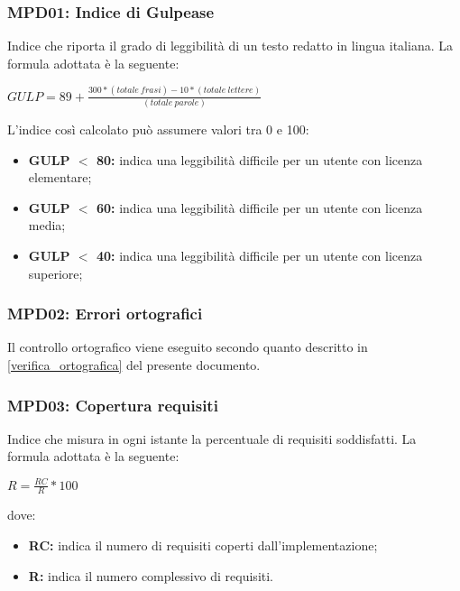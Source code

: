    \subsubsection{MPD01: Indice di Gulpease}
    Indice che riporta il grado di leggibilità di un testo redatto in lingua italiana.
    La formula adottata è la seguente: 
    \begin{center}
        $GULP = 89 + \displaystyle \frac{300*(totale\ frasi)-10*(totale\ lettere)}{(totale\ parole)}$
    \end{center}
    L’indice così calcolato può assumere valori tra 0 e 100:
    \begin{itemize}
        \item \textbf{GULP $<$ 80:} indica una leggibilità difficile per un utente con licenza elementare;
        \item \textbf{GULP $<$ 60:} indica una leggibilità difficile per un utente con licenza media;
        \item \textbf{GULP $<$ 40:} indica una leggibilità difficile per un utente con licenza superiore;
    \end{itemize}

    \subsubsection{MPD02: Errori ortografici}
    Il controllo ortografico viene eseguito secondo quanto descritto in \ref{verifica_ortografica} del presente documento.

    \subsubsection{MPD03: Copertura requisiti}
    Indice che misura in ogni istante la percentuale di requisiti soddisfatti.
    La formula adottata è la seguente:
    \begin{center}
        $R = \displaystyle \frac{RC}{R}*100$
    \end{center}
    dove:
    \begin{itemize}
        \item \textbf{RC:} indica il numero di requisiti coperti dall'implementazione;
        \item \textbf{R:} indica il numero complessivo di requisiti.
    \end{itemize}